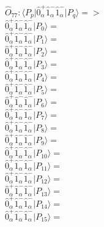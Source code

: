 \documentclass[14pt]{article}
\begin{document}
    $\hat{O}_{77}:  \langle{P_p}\vert \hat{0}_{\alpha}^{+}\hat{1}_{\alpha}^{-}\hat{1}_{\alpha}^{-} \vert{P_q}\rangle => $ \\ 
    $ \hat{0}_{\alpha}^{+}\hat{1}_{\alpha}^{-}\hat{1}_{\alpha}^{-} \vert{P_{0}}\rangle =  $ \\ 
    $ \hat{0}_{\alpha}^{+}\hat{1}_{\alpha}^{-}\hat{1}_{\alpha}^{-} \vert{P_{1}}\rangle =  $ \\ 
    $ \hat{0}_{\alpha}^{+}\hat{1}_{\alpha}^{-}\hat{1}_{\alpha}^{-} \vert{P_{2}}\rangle =  $ \\ 
    $ \hat{0}_{\alpha}^{+}\hat{1}_{\alpha}^{-}\hat{1}_{\alpha}^{-} \vert{P_{3}}\rangle =  $ \\ 
    $ \hat{0}_{\alpha}^{+}\hat{1}_{\alpha}^{-}\hat{1}_{\alpha}^{-} \vert{P_{4}}\rangle =  $ \\ 
    $ \hat{0}_{\alpha}^{+}\hat{1}_{\alpha}^{-}\hat{1}_{\alpha}^{-} \vert{P_{5}}\rangle =  $ \\ 
    $ \hat{0}_{\alpha}^{+}\hat{1}_{\alpha}^{-}\hat{1}_{\alpha}^{-} \vert{P_{6}}\rangle =  $ \\ 
    $ \hat{0}_{\alpha}^{+}\hat{1}_{\alpha}^{-}\hat{1}_{\alpha}^{-} \vert{P_{7}}\rangle =  $ \\ 
    $ \hat{0}_{\alpha}^{+}\hat{1}_{\alpha}^{-}\hat{1}_{\alpha}^{-} \vert{P_{8}}\rangle =  $ \\ 
    $ \hat{0}_{\alpha}^{+}\hat{1}_{\alpha}^{-}\hat{1}_{\alpha}^{-} \vert{P_{9}}\rangle =  $ \\ 
    $ \hat{0}_{\alpha}^{+}\hat{1}_{\alpha}^{-}\hat{1}_{\alpha}^{-} \vert{P_{10}}\rangle =  $ \\ 
    $ \hat{0}_{\alpha}^{+}\hat{1}_{\alpha}^{-}\hat{1}_{\alpha}^{-} \vert{P_{11}}\rangle =  $ \\ 
    $ \hat{0}_{\alpha}^{+}\hat{1}_{\alpha}^{-}\hat{1}_{\alpha}^{-} \vert{P_{12}}\rangle =  $ \\ 
    $ \hat{0}_{\alpha}^{+}\hat{1}_{\alpha}^{-}\hat{1}_{\alpha}^{-} \vert{P_{13}}\rangle =  $ \\ 
    $ \hat{0}_{\alpha}^{+}\hat{1}_{\alpha}^{-}\hat{1}_{\alpha}^{-} \vert{P_{14}}\rangle =  $ \\ 
    $ \hat{0}_{\alpha}^{+}\hat{1}_{\alpha}^{-}\hat{1}_{\alpha}^{-} \vert{P_{15}}\rangle =  $ \\ 
    
\end{document}
